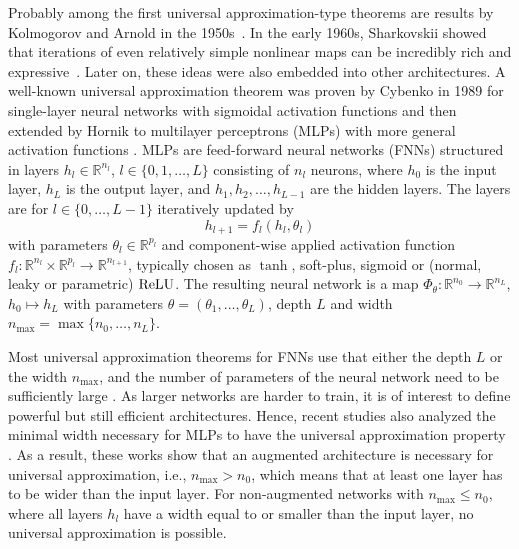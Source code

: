 \documentclass[10pt]{article}
\numberwithin{equation}{section}
\newcommand{\R}{\mathbb{R}}
\begin{document}
	Probably among the first universal approximation-type theorems are results by Kolmogorov and Arnold in the 1950s~\cite{Arnold2009, Kolmogorov1956}. In the early 1960s, Sharkovskii showed that iterations of even relatively simple nonlinear maps can be incredibly rich and expressive~\cite{Sharkovskii1995}. Later on, these ideas were also embedded into other architectures. A well-known universal approximation theorem was proven by Cybenko in 1989 for single-layer neural networks with sigmoidal activation functions \cite{Cybenko1989} and then extended by Hornik to multilayer perceptrons (MLPs) with more general activation functions \cite{Hornik1991,Hornik1989}. MLPs are feed-forward neural networks (FNNs) structured in layers $h_l \in \mathbb{R}^{n_l}$, $l \in \{0,1,\ldots,L\}$ consisting of  $n_l$ neurons, where $h_0$ is the input layer, $h_L$ is the output layer, and $h_1,h_2,\ldots,h_{L-1}$ are the hidden layers. The layers are for $l\in\{0,\ldots,L-1\}$ iteratively updated by
	\begin{equation} \label{eq:MLP}
		h_{l+1} = f_l(h_{l},\theta_l)
	\end{equation}
	with parameters $\theta_l\in\R^{p_l}$ and component-wise applied activation function $f_l:\R^{n_l}\times \R^{p_l}\rightarrow \R^{n_{l+1}}$, typically chosen as $\tanh$, soft-plus, sigmoid or (normal, leaky or parametric) $\textup{ReLU}$. The resulting neural network is a map $\Phi_\theta: \R^{n_0}\rightarrow \R^{n_L}$, $h_0\mapsto h_L$ with parameters $\theta = (\theta_1,\ldots,\theta_L)$, depth $L$ and width $n_\text{max} = \max\{n_0,\ldots,n_L\}.$
	
	Most universal approximation theorems for FNNs use that either the depth $L$ or the width $n_\text{max}$, and the number of parameters of the neural network need to be sufficiently large \cite{Kidger2022, Lu2017}. As larger networks are harder to train, it is of interest to define powerful but still efficient architectures. Hence, recent studies also analyzed the minimal width necessary for MLPs to have the universal approximation property \cite{Hanin2018,Johnson2018,Park2020}. As a result, these works show that an augmented architecture is necessary for universal approximation, i.e., $n_\text{max}>n_0$, which means that at least one layer has to be wider than the input layer. For non-augmented networks with $n_\text{max}\leq n_0$, where all layers $h_l$ have a width equal to or smaller than the input layer, no universal approximation is possible.
	
\end{document}
